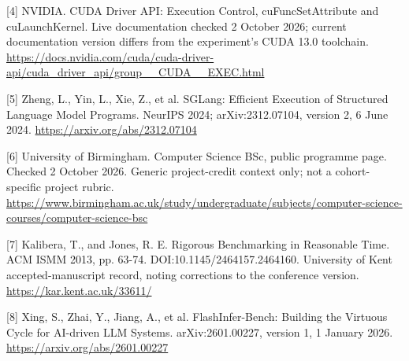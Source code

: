 \documentclass[11pt,a4paper]{article}
\begin{document}
[4] NVIDIA. CUDA Driver API: Execution Control, cuFuncSetAttribute and cuLaunchKernel. Live documentation checked 2 October 2026; current documentation version differs from the experiment's CUDA 13.0 toolchain. \url{https://docs.nvidia.com/cuda/cuda-driver-api/cuda_driver_api/group__CUDA__EXEC.html}


[5] Zheng, L., Yin, L., Xie, Z., et al. SGLang: Efficient Execution of Structured Language Model Programs. NeurIPS 2024; arXiv:2312.07104, version 2, 6 June 2024. \url{https://arxiv.org/abs/2312.07104}


[6] University of Birmingham. Computer Science BSc, public programme page. Checked 2 October 2026. Generic project-credit context only; not a cohort-specific project rubric. \url{https://www.birmingham.ac.uk/study/undergraduate/subjects/computer-science-courses/computer-science-bsc}


[7] Kalibera, T., and Jones, R. E. Rigorous Benchmarking in Reasonable Time. ACM ISMM 2013, pp. 63-74. DOI:10.1145/\allowbreak{}2464157.2464160. University of Kent accepted-manuscript record, noting corrections to the conference version. \url{https://kar.kent.ac.uk/33611/}


[8] Xing, S., Zhai, Y., Jiang, A., et al. FlashInfer-Bench: Building the Virtuous Cycle for AI-driven LLM Systems. arXiv:2601.00227, version 1, 1 January 2026. \url{https://arxiv.org/abs/2601.00227}
\end{document}
